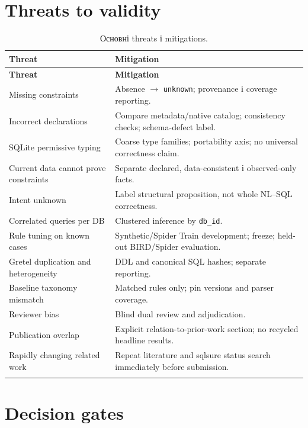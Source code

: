 \documentclass[11pt,a4paper]{article}
\newcommand{\unknown}{\texttt{unknown}}
\begin{document}
\section{Threats to validity}

\begin{longtable}{>{\raggedright\arraybackslash}p{4cm}
                  >{\raggedright\arraybackslash}p{9.8cm}}
\toprule
\textbf{Threat} & \textbf{Mitigation} \\
\midrule
\endfirsthead
\toprule
\textbf{Threat} & \textbf{Mitigation} \\
\midrule
\endhead
Missing constraints &
Absence $\rightarrow$ \unknown; provenance і coverage reporting. \\
Incorrect declarations &
Compare metadata/native catalog; consistency checks; schema-defect label. \\
SQLite permissive typing &
Coarse type families; portability axis; no universal correctness claim. \\
Current data cannot prove constraints &
Separate declared, data-consistent і observed-only facts. \\
Intent unknown &
Label structural proposition, not whole NL--SQL correctness. \\
Correlated queries per DB &
Clustered inference by \texttt{db\_id}. \\
Rule tuning on known cases &
Synthetic/Spider Train development; freeze; held-out BIRD/Spider evaluation. \\
Gretel duplication and heterogeneity &
DDL and canonical SQL hashes; separate reporting. \\
Baseline taxonomy mismatch &
Matched rules only; pin versions and parser coverage. \\
Reviewer bias &
Blind dual review and adjudication. \\
Publication overlap &
Explicit relation-to-prior-work section; no recycled headline results. \\
Rapidly changing related work &
Repeat literature and sqlsure status search immediately before submission. \\
\bottomrule
\caption{Основні threats і mitigations.}
\end{longtable}

\section{Decision gates}
\end{document}
